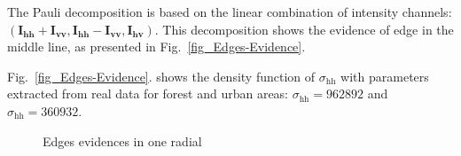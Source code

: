 \documentclass[remotesensing,article,submit,moreauthors,pdftex]{Definitions/mdpi}
\begin{document}
The Pauli decomposition is based on the linear combination of intensity channels: $(\mathbf{I_\text{hh}+I_{\text{vv}}}, \mathbf{I_\text{hh}-I_{\text{vv}}}, \mathbf{I_\text{hv}})$. This decomposition shows the evidence of edge in the middle line, as presented in Fig.~\ref{fig_Edges-Evidence}. 

Fig.~\ref{fig_Edges-Evidence}. 
shows the density function of $\sigma_\text{hh}$ with parameters extracted from real data for forest and urban areas: $\sigma_\text{hh}=962892$ and $\sigma_\text{hh}= 360932$.  
    
\begin{figure}[hbt]
	\centering
     \caption{Edges evidences in one radial}
     \label{fig_evid_bordas}
   \end{figure}	
\end{document}
